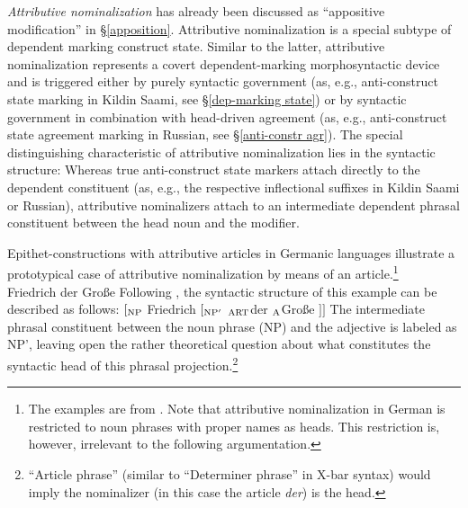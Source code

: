 \emph{Attributive nominalization} has already been discussed as “appositive modification” in \S\ref{apposition}. Attributive nominalization is a special subtype of dependent marking construct state. Similar to the latter, attributive nominalization represents a covert dependent-marking morphosyntactic device and is triggered either by purely syntactic government (as, e.g., anti-construct state marking in Kildin Saami, see \S\ref{dep-marking state}) or by syntactic government in combination with head-driven agreement (as, e.g., anti-construct state agreement marking in Russian, see \S\ref{anti-constr agr}). The special distinguishing characteristic of attributive nominalization lies in the syntactic structure: Whereas true anti-construct state markers attach directly to the dependent constituent (as, e.g., the respective inflectional suffixes in Kildin Saami or Russian), attributive nominalizers attach to an intermediate dependent phrasal constituent between the head noun and the modifier.

Epithet-constructions with attributive articles in Germanic languages illustrate a prototypical case of attributive nominalization by means of an article.\footnote{The examples are from \citet[179–180]{himmelmann1997}. Note that attributive nominalization in German is restricted to noun phrases with proper names as heads. This restriction is, however, irrelevant to the following argumentation.}
\ea  \label{german epithet}
\\
Friedrich der Große 			
\z
Following \citet[180]{himmelmann1997}, the syntactic structure of this example can be described as follows:
\ea	$[_{\rm NP}$ Friedrich $[_{\rm NP'}$ $_{\rm ART}$der $_{\rm A}$Große $] ]$
\z
The intermediate phrasal constituent between the noun phrase (NP) and the adjective is labeled as NP', leaving open the rather theoretical question about what constitutes the syntactic head of this phrasal projection.\footnote{“Article phrase” (similar to “Determiner phrase” in X-bar syntax) would imply the nominalizer (in this case the article \textit{der}) is the head.}

